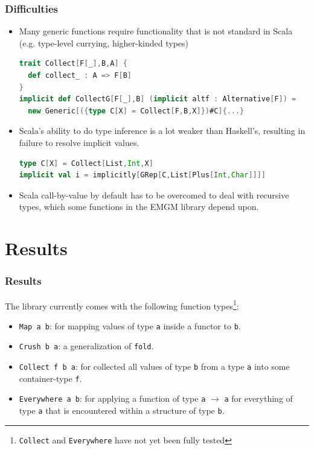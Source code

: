 \documentclass[10pt]{beamer}
\begin{document}
\begin{frame}[fragile]
\frametitle{Difficulties}

\begin{itemize}
\item Many generic functions require functionality that is not standard in Scala (e.g. type-level currying, higher-kinded types)
\begin{lstlisting}[language=Scala,basicstyle=\ttfamily\scriptsize,mathescape]
trait Collect[F[_],B,A] {
  def collect_ : A => F[B]
}
implicit def CollectG[F[_],B] (implicit altf : Alternative[F]) = 
  new Generic[({type C[X] = Collect[F,B,X]})#C]{...}
\end{lstlisting}  


\item Scala's ability to do type inference is a lot weaker than Haskell's, resulting in failure to resolve implicit values.
\begin{lstlisting}[language=Scala,basicstyle=\ttfamily\scriptsize,mathescape]
type C[X] = Collect[List,Int,X]
implicit val i = implicitly[GRep[C,List[Plus[Int,Char]]]]
\end{lstlisting}  

\item Scala call-by-value by default has to be overcomed to deal with recursive types, which some functions in the EMGM library depend upon.
\end{itemize}
\end{frame}

\section{Results}

\begin{frame}
\frametitle{Results}
The library currently comes with the following function types\footnote{\texttt{Collect} and \texttt{Everywhere} have not yet been fully tested}:
\begin{itemize}
\item \texttt{Map a b}: for mapping values of type \texttt{a} inside a functor to \texttt{b}.
\item \texttt{Crush b a}: a generalization of \texttt{fold}.
\item \texttt{Collect f b a}: for collected all values of type \texttt{b} from a type \texttt{a} into some container-type \texttt{f}.
\item \texttt{Everywhere a b}: for applying a function of type \texttt{a} $\rightarrow$ \texttt{a} for everything of type \texttt{a} that is encountered within a structure of type \texttt{b}.
\end{itemize}
\end{frame}
\end{document}
